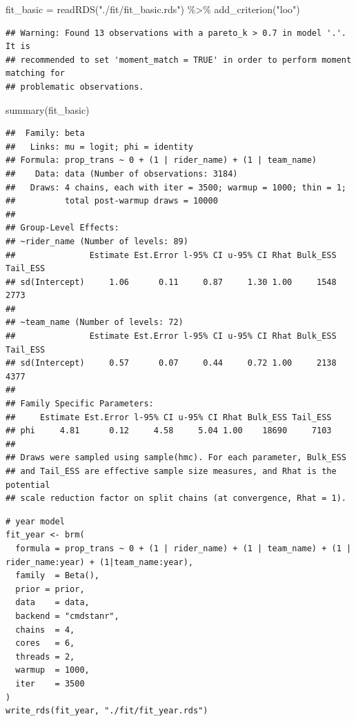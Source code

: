 \documentclass[
]{article}
\newenvironment{Shaded}{\begin{snugshade}}{\end{snugshade}}
\newcommand{\FunctionTok}[1]{\textcolor[rgb]{0.00,0.00,0.00}{#1}}
\newcommand{\NormalTok}[1]{#1}
\newcommand{\OtherTok}[1]{\textcolor[rgb]{0.56,0.35,0.01}{#1}}
\newcommand{\SpecialCharTok}[1]{\textcolor[rgb]{0.00,0.00,0.00}{#1}}
\newcommand{\StringTok}[1]{\textcolor[rgb]{0.31,0.60,0.02}{#1}}
\begin{document}
\begin{Shaded}
\begin{Highlighting}[]
\NormalTok{fit\_basic }\OtherTok{=} \FunctionTok{readRDS}\NormalTok{(}\StringTok{"./fit/fit\_basic.rds"}\NormalTok{) }\SpecialCharTok{\%\textgreater{}\%} \FunctionTok{add\_criterion}\NormalTok{(}\StringTok{"loo"}\NormalTok{)}
\end{Highlighting}
\end{Shaded}

\begin{verbatim}
## Warning: Found 13 observations with a pareto_k > 0.7 in model '.'. It is
## recommended to set 'moment_match = TRUE' in order to perform moment matching for
## problematic observations.
\end{verbatim}

\begin{Shaded}
\begin{Highlighting}[]
\FunctionTok{summary}\NormalTok{(fit\_basic)}
\end{Highlighting}
\end{Shaded}

\begin{verbatim}
##  Family: beta 
##   Links: mu = logit; phi = identity 
## Formula: prop_trans ~ 0 + (1 | rider_name) + (1 | team_name) 
##    Data: data (Number of observations: 3184) 
##   Draws: 4 chains, each with iter = 3500; warmup = 1000; thin = 1;
##          total post-warmup draws = 10000
## 
## Group-Level Effects: 
## ~rider_name (Number of levels: 89) 
##               Estimate Est.Error l-95% CI u-95% CI Rhat Bulk_ESS Tail_ESS
## sd(Intercept)     1.06      0.11     0.87     1.30 1.00     1548     2773
## 
## ~team_name (Number of levels: 72) 
##               Estimate Est.Error l-95% CI u-95% CI Rhat Bulk_ESS Tail_ESS
## sd(Intercept)     0.57      0.07     0.44     0.72 1.00     2138     4377
## 
## Family Specific Parameters: 
##     Estimate Est.Error l-95% CI u-95% CI Rhat Bulk_ESS Tail_ESS
## phi     4.81      0.12     4.58     5.04 1.00    18690     7103
## 
## Draws were sampled using sample(hmc). For each parameter, Bulk_ESS
## and Tail_ESS are effective sample size measures, and Rhat is the potential
## scale reduction factor on split chains (at convergence, Rhat = 1).
\end{verbatim}

\begin{verbatim}
# year model
fit_year <- brm(
  formula = prop_trans ~ 0 + (1 | rider_name) + (1 | team_name) + (1 | rider_name:year) + (1|team_name:year),
  family  = Beta(),
  prior = prior,
  data    = data,
  backend = "cmdstanr",
  chains  = 4,
  cores   = 6,
  threads = 2,
  warmup  = 1000,
  iter    = 3500
)
write_rds(fit_year, "./fit/fit_year.rds")
\end{verbatim}
\end{document}
